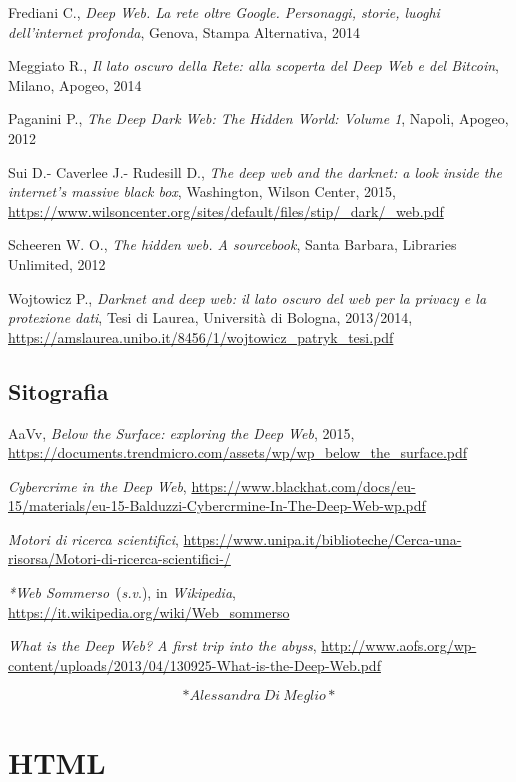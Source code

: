 \documentclass[
  b5paper,
  twoside,
  12pt,
  chapterprefix=false,
  bibliography=totocnumbered,
  parskip=false]{scrbook}
\begin{document}
Frediani C., \emph{Deep Web. La rete oltre Google. Personaggi, storie, luoghi
dell'internet profonda}, Genova, Stampa Alternativa, 2014

Meggiato R., \emph{Il lato oscuro della Rete: alla scoperta del Deep Web e
del Bitcoin}, Milano, Apogeo, 2014

Paganini P., \emph{The Deep Dark Web: The Hidden World: Volume 1}, Napoli,
Apogeo, 2012

Sui D.- Caverlee J.- Rudesill D., \emph{The deep web and the darknet: a look
inside the internet's massive black box}, Washington, Wilson Center,
2015,
\url{https://www.wilsoncenter.org/sites/default/files/stip/_dark/_web.pdf}

Scheeren W. O., \emph{The hidden web. A sourcebook}, Santa Barbara, Libraries
Unlimited, 2012

Wojtowicz P., \emph{Darknet and deep web: il lato oscuro del web per la
privacy e la protezione dati}, Tesi di Laurea, Università di Bologna,
2013/2014,
\url{https://amslaurea.unibo.it/8456/1/wojtowicz_patryk_tesi.pdf}

\hypertarget{sitografia-16}{%
\section*{Sitografia}\label{sitografia-16}}

AaVv, \emph{Below the Surface: exploring the Deep Web}, 2015,
\url{https://documents.trendmicro.com/assets/wp/wp_below_the_surface.pdf}

\emph{Cybercrime in the Deep Web},
\url{https://www.blackhat.com/docs/eu-15/materials/eu-15-Balduzzi-Cybercrmine-In-The-Deep-Web-wp.pdf}

\emph{Motori di ricerca scientifici},
\url{https://www.unipa.it/biblioteche/Cerca-una-risorsa/Motori-di-ricerca-scientifici-/}

\emph{*Web Sommerso}~(\emph{s.v}.), in \emph{Wikipedia},
\url{https://it.wikipedia.org/wiki/Web_sommerso}

\emph{What is the Deep Web? A first trip into the abyss},
\url{http://www.aofs.org/wp-content/uploads/2013/04/130925-What-is-the-Deep-Web.pdf}

\[*Alessandra~Di~Meglio*\]

\hypertarget{html}{%
\chapter{HTML}\label{html}}
\end{document}
